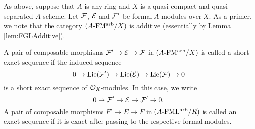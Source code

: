 \documentclass[../main.tex]{subfiles}
\begin{document}
As above, suppose that $A$ is any ring and $X$ is a quasi-compact and
quasi-separated $A$-scheme. Let $\mathcal{F}$, $\mathcal{E}$ and $\mathcal{F}'$ be formal $A$-modules
over $X$. As a primer, we note that the category ${({A}\text-\mathrm{FM^{arb}}/{X})}$ is additive 
(essentially by Lemma \ref{lem:FGLAdditive}).

\begin{defi}\label{def:SESofFormalModules}
  A pair of composable morphisms $\mathcal{F}' \to \mathcal{E} \to \mathcal{F}$ in 
  ${({A}\text-\mathrm{FM^{arb}}/{X})}$ is called 
  a short exact sequence if the induced sequence 
  \begin{equation*}
    0 \to \operatorname{Lie}(\mathcal{F}') \to \operatorname{Lie}(\mathcal{E}) \to \operatorname{Lie}(\mathcal{F}) \to 0
  \end{equation*}
  is a short exact sequence of $\mathcal{O}_X$-modules. In this case, we write
  \begin{equation*}
    0 \to \mathcal{F}' \to \mathcal{E} \to \mathcal{F}' \to 0.
  \end{equation*}
  A pair of composable morphisms $F' \to E \to F$ in ${({A}\text-\mathrm{FML^{arb}}/{R})}$
  is called an exact sequence if it is exact after passing to 
  the respective formal modules. 
\end{defi}
\end{document}
